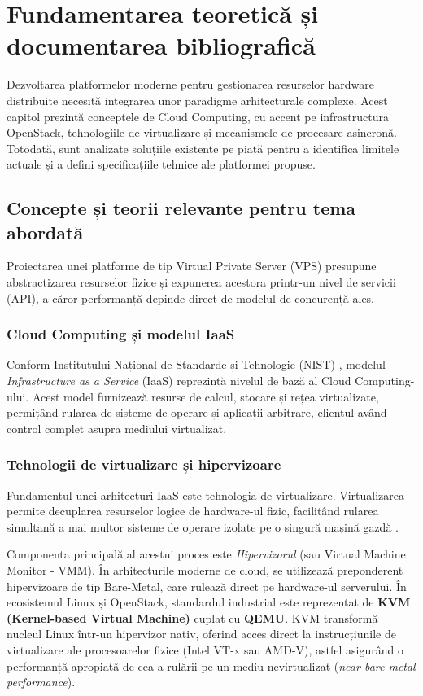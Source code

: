 \chapter{Fundamentarea teoretică și documentarea bibliografică}
\label{cap:cap2}

Dezvoltarea platformelor moderne pentru gestionarea resurselor hardware distribuite necesită integrarea unor paradigme arhitecturale complexe. Acest capitol prezintă conceptele de Cloud Computing, cu accent pe infrastructura OpenStack, tehnologiile de virtualizare și mecanismele de procesare asincronă. Totodată, sunt analizate soluțiile existente pe piață pentru a identifica limitele actuale și a defini specificațiile tehnice ale platformei propuse.

\section{Concepte și teorii relevante pentru tema abordată}

Proiectarea unei platforme de tip Virtual Private Server (VPS) presupune abstractizarea resurselor fizice și expunerea acestora printr-un nivel de servicii (API), a căror performanță depinde direct de modelul de concurență ales.

\subsection{Cloud Computing și modelul IaaS}

Conform Institutului Național de Standarde și Tehnologie (NIST) \cite{mell2011nist}, modelul \textit{Infrastructure as a Service} (IaaS) reprezintă nivelul de bază al Cloud Computing-ului. Acest model furnizează resurse de calcul, stocare și rețea virtualizate, permițând rularea de sisteme de operare și aplicații arbitrare, clientul având control complet asupra mediului virtualizat.

\subsection{Tehnologii de virtualizare și hipervizoare}

Fundamentul unei arhitecturi IaaS este tehnologia de virtualizare. Virtualizarea permite decuplarea resurselor logice de hardware-ul fizic, facilitând rularea simultană a mai multor sisteme de operare izolate pe o singură mașină gazdă \cite{smith2019cloud}. 

Componenta principală al acestui proces este \textit{Hipervizorul} (sau Virtual Machine Monitor - VMM). În arhitecturile moderne de cloud, se utilizează preponderent hipervizoare de tip Bare-Metal, care rulează direct pe hardware-ul serverului. În ecosistemul Linux și OpenStack, standardul industrial este reprezentat de \textbf{KVM (Kernel-based Virtual Machine)} cuplat cu \textbf{QEMU}. KVM transformă nucleul Linux într-un hipervizor nativ, oferind acces direct la instrucțiunile de virtualizare ale procesoarelor fizice (Intel VT-x sau AMD-V), astfel asigurând o performanță apropiată de cea a rulării pe un mediu nevirtualizat (\textit{near bare-metal performance}).

